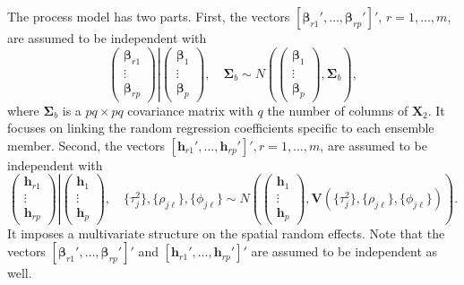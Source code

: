 \documentclass[12pt]{amsart}
\begin{document}
The process model has two parts. First, the vectors $[\boldsymbol{\beta}_{r1}',\dots,\boldsymbol{\beta}_{rp}']', \, r = 1, \dots, m$, are assumed to be independent with
$$  \left .
    \begin{pmatrix}
        \boldsymbol{\beta}_{r1} \\
        \vdots \\
        \boldsymbol{\beta}_{rp}
    \end{pmatrix}  \right \vert
    \begin{pmatrix}
        \boldsymbol{\beta}_{1} \\
        \vdots \\
        \boldsymbol{\beta}_{p}
    \end{pmatrix}, \quad \boldsymbol{\Sigma}_b \sim N \left(   
        \begin{pmatrix}
            \boldsymbol{\beta}_{1} \\
            \vdots \\
            \boldsymbol{\beta}_{p}
        \end{pmatrix}, \boldsymbol{\Sigma}_b
    \right),
$$
where $\boldsymbol{\Sigma}_b$ is a $pq \times pq$ covariance matrix with $q$ the number of columns of $\boldsymbol{X}_2$. It focuses on linking the random regression coefficients specific to each ensemble member. Second, the vectors $[\boldsymbol{h}_{r1}', \dots, \boldsymbol{h}_{rp}']', r = 1, \dots, m$, are assumed to be independent with 
$$
    \left .
    \begin{pmatrix}
        \boldsymbol{h}_{r1} \\
        \vdots \\
        \boldsymbol{h}_{rp}
    \end{pmatrix}  \right \vert
    \begin{pmatrix}
        \boldsymbol{h}_{1} \\
        \vdots \\
        \boldsymbol{h}_{p}
    \end{pmatrix}, \quad \{\tau_j^2\}, \{\rho_{j\ell}\}, \{\phi_{j\ell}\} \sim N \left(   
        \begin{pmatrix}
            \boldsymbol{h}_{1} \\
            \vdots \\
            \boldsymbol{h}_{p}
        \end{pmatrix}, \boldsymbol{V}(\{\tau_j^2\}, \{\rho_{j\ell}\}, \{\phi_{j\ell}\})
    \right).
$$
It imposes a multivariate structure on the spatial random effects. Note that the vectors $[\boldsymbol{\beta}_{r1}', \dots,\boldsymbol{\beta}_{rp}']'$ and $[\boldsymbol{h}_{r1}', \dots,\boldsymbol{h}_{rp}']'$ are assumed to be independent as well.
\end{document}
